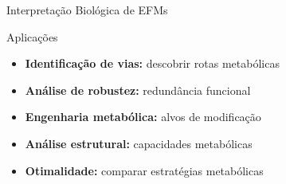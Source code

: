 \begin{frame}{Interpretação Biológica de EFMs}
\begin{exampleblock}{Aplicações}
\begin{itemize}
    \item \textbf{Identificação de vias:} descobrir rotas metabólicas
    \item \textbf{Análise de robustez:} redundância funcional
    \item \textbf{Engenharia metabólica:} alvos de modificação
    \item \textbf{Análise estrutural:} capacidades metabólicas
    \item \textbf{Otimalidade:} comparar estratégias metabólicas
\end{itemize}
\end{exampleblock}

\vspace{0.3cm}

\end{frame}

